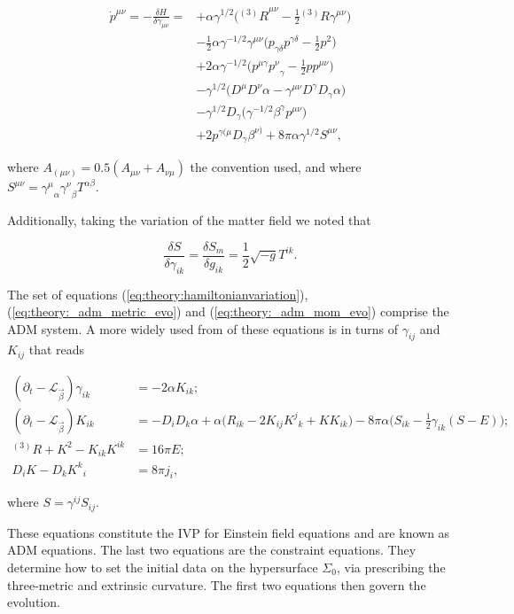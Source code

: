 \begin{align}
\dot{p}^{\mu\nu} = -\frac{\delta H}{\delta \gamma_{\mu\nu}} = &+ \alpha\gamma^{1/2}\big({^{(3)}R}^{\mu\nu}-\frac{1}{2}{^{(3)}R\gamma^{\mu\nu}}\big) \\
& - \frac{1}{2}\alpha\gamma^{-1/2}\gamma^{\mu\nu}\big(p_{\gamma\delta}p^{\gamma\delta}-\frac{1}{2}p^2\big) \\
& + 2\alpha\gamma^{-1/2}\big(p^{\mu\gamma}{p^{\nu}}_{\gamma}-\frac{1}{2}pp^{\mu\nu}\big) \\
& - \gamma^{1/2}\big(D^{\mu}D^{\nu}\alpha-\gamma^{\mu\nu}D^{\gamma}D_{\gamma}\alpha\big) \\
& - \gamma^{1/2}D_{\gamma}\big(\gamma^{-1/2}\beta^{\gamma}p^{\mu\nu}\big) \\
&+ 2p^{\gamma(\mu}D_{\gamma}\beta^{\nu)} + 8\pi \alpha \gamma^{1/2}S^{\mu\nu},
\label{eq:theory:_adm_mom_evo}
\end{align}

where $A_{(\mu\nu)} = 0.5(A_{\mu\nu}+A_{\nu\mu})$ the convention used, and where $S^{\mu\nu}={\gamma^{\mu}}_{\alpha}{\gamma^{\nu}}_{\beta}T^{\alpha\beta}$. 

Additionally, taking the variation of the matter field we noted that

\begin{equation}
\frac{\delta S}{\delta \gamma_{ik}} = \frac{\delta S_m}{\delta g_{ik}} = \frac{1}{2}\sqrt{-g}T^{ik}.
\end{equation}

The set of equations (\ref{eq:theory:hamiltonianvariation}), (\ref{eq:theory:_adm_metric_evo}) and (\ref{eq:theory:_adm_mom_evo}) comprise the ADM system. 
A more widely used from of these equations is in turns of $\gamma_{ij}$ and $K_{ij}$ that reads

\begin{align}
(\partial_t - \mathcal{L}_{\vec{\beta}})\gamma_{ik} &= -2\alpha K_{ik}; \\
(\partial_t - \mathcal{L}_{\vec{\beta}})K_{ik} &= -D_{i}D_{k}\alpha + \alpha\big(R_{ik} - 2K_{ij}{K^j}_k+KK_{ik}\big) - 8\pi\alpha\big(S_{ik} - \frac{1}{2}\gamma_{ik}(S-E)\big); \\
{^{(3)}R} + K^2 - K_{ik}K^{ik} &= 16\pi E; \\
D_{i}K-D_{k}{K^k}_i &= 8\pi j_i,
\label{eq:theory:adm}
\end{align}

where $S = \gamma^{ij}S_{ij}$.

These equations constitute the IVP for Einstein field equations and are known as ADM equations. 
The last two equations are the constraint equations. They determine how to set the initial data on the hypersurface $\Sigma_0$, via prescribing the three-metric and extrinsic curvature. The first two equations then govern the evolution.

